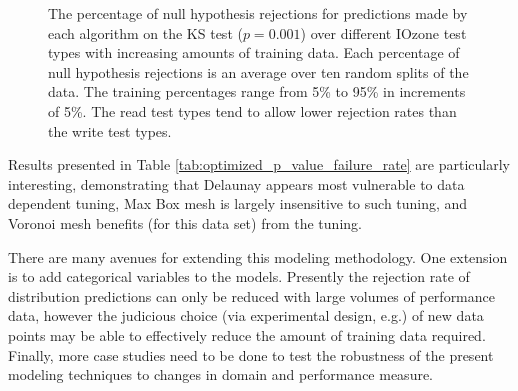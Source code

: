 \documentclass[letterpaper, 10 pt, conference]{ieeeconf}  %
\begin{document}
\begin{figure}
  \caption{The percentage of null hypothesis rejections for predictions made by each algorithm on the KS test ($p=0.001$) over different IOzone test types with increasing amounts of training data. Each percentage of null hypothesis rejections is an average over ten random splits of the data. The training percentages range from 5\% to 95\% in increments of 5\%. The read test types tend to allow lower rejection rates than the write test types.
  \vspace{-.1cm}}
  \label{fig:ks_failure_by_training_and_test}
\end{figure}


Results presented in Table \ref{tab:optimized_p_value_failure_rate} are particularly interesting, demonstrating that Delaunay appears most vulnerable to data dependent tuning, Max Box mesh is largely insensitive to such tuning, and Voronoi mesh benefits (for this data set) from the tuning.

There are many avenues for extending this modeling methodology. One extension is to add categorical variables to the models. Presently the rejection rate of distribution predictions can only be reduced with large volumes of performance data, however the judicious choice (via experimental design, e.g.) of new data points may be able to effectively reduce the amount of training data required. Finally, more case studies need to be done to test the robustness of the present modeling techniques to changes in domain and performance measure.
\end{document}
